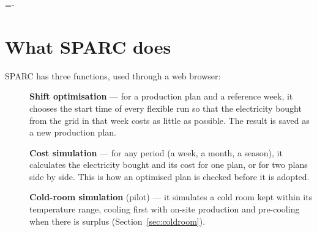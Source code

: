 \documentclass[10pt,a4paper]{scrartcl}
\makeatletter
\renewcommand{\emph}[1]{\textcolor{accent}{#1}}
\newcommand{\NeedSpace}[1]{\par\begingroup\dimen@=\pagegoal\advance\dimen@-\pagetotal
    \ifdim\dimen@<#1\relax\newpage\fi\endgroup}
\newcommand{\RuleSection}[1]{%
    \NeedSpace{10\baselineskip}%
    \section{#1}%
    \vspace{0.2em}{\color{accent!35}\hrule height 0.4pt}\vspace{0.3em}%
  }
\makeatother
\begin{document}
  \RuleSection{What SPARC does}
  \label{sec:tool}

  SPARC has three functions, used through a web browser:

  \begin{description}
    \item[] \textbf{Shift optimisation} --- for a production plan and a \emph{reference week}, it
      chooses the start time of every flexible run so that the electricity bought from the grid in
      that week costs as little as possible. The result is saved as a new production plan.
    \item[] \textbf{Cost simulation} --- for any period (a week, a month, a season), it calculates
      the electricity bought and its cost for one plan, or for two plans side by side. This is how
      an optimised plan is checked before it is adopted.
    \item[] \textbf{Cold-room simulation} (pilot) --- it simulates a cold room kept within its
      temperature range, cooling first with on-site production and pre-cooling when there is
      surplus (Section~\ref{sec:coldroom}).
  \end{description}
\end{document}
